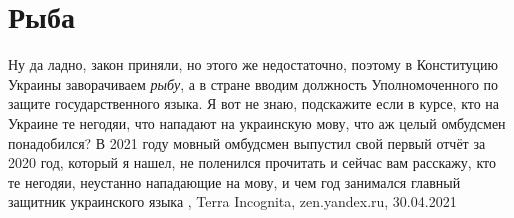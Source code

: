  
 
 
 
 
\chapter{Рыба}
\label{sec:slova.ryba}

Ну да ладно, закон приняли, но этого же недостаточно, поэтому в Конституцию
Украины заворачиваем \emph{рыбу}, а в стране вводим должность Уполномоченного по
защите государственного языка. Я вот не знаю, подскажите если в курсе, кто на
Украине те негодяи, что нападают на украинскую мову, что аж целый омбудсмен
понадобился?  В 2021 году мовный омбудсмен выпустил свой первый отчёт за 2020
год, который я нашел, не поленился прочитать и сейчас вам расскажу, кто те
негодяи, неустанно нападающие на мову, и чем год занимался главный защитник
украинского языка
, 
Terra Incognita, zen.yandex.ru, 30.04.2021
